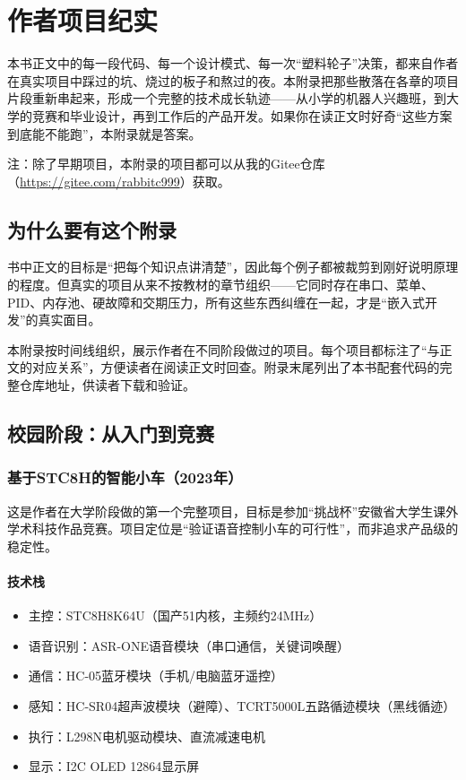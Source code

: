 \chapter{作者项目纪实} \label{app:author-projects}

本书正文中的每一段代码、每一个设计模式、每一次“塑料轮子”决策，都来自作者在真实项目中踩过的坑、烧过的板子和熬过的夜。本附录把那些散落在各章的项目片段重新串起来，形成一个完整的技术成长轨迹——从小学的机器人兴趣班，到大学的竞赛和毕业设计，再到工作后的产品开发。如果你在读正文时好奇“这些方案到底能不能跑”，本附录就是答案。

注：除了早期项目，本附录的项目都可以从我的Gitee仓库（\url{https://gitee.com/rabbitc999}）获取。

\section{为什么要有这个附录}

书中正文的目标是“把每个知识点讲清楚”，因此每个例子都被裁剪到刚好说明原理的程度。但真实的项目从来不按教材的章节组织——它同时存在串口、菜单、PID、内存池、硬故障和交期压力，所有这些东西纠缠在一起，才是“嵌入式开发”的真实面目。

本附录按时间线组织，展示作者在不同阶段做过的项目。每个项目都标注了“与正文的对应关系”，方便读者在阅读正文时回查。附录末尾列出了本书配套代码的完整仓库地址，供读者下载和验证。


\section{校园阶段：从入门到竞赛}


\subsection{基于STC8H的智能小车（2023年）}

这是作者在大学阶段做的第一个完整项目，目标是参加“挑战杯”安徽省大学生课外学术科技作品竞赛。项目定位是“验证语音控制小车的可行性”，而非追求产品级的稳定性。

\subsubsection{技术栈}

\begin{itemize}
	\item 主控：STC8H8K64U（国产51内核，主频约24MHz）
	\item 语音识别：ASR-ONE语音模块（串口通信，关键词唤醒）
	\item 通信：HC-05蓝牙模块（手机/电脑蓝牙遥控）
	\item 感知：HC-SR04超声波模块（避障）、TCRT5000L五路循迹模块（黑线循迹）
	\item 执行：L298N电机驱动模块、直流减速电机
	\item 显示：I2C OLED 12864显示屏
\end{itemize}

